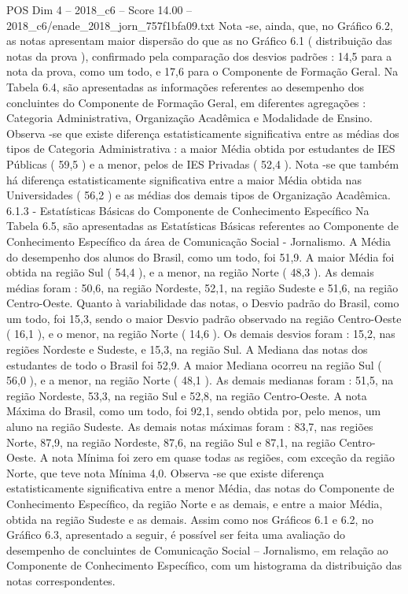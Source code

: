 \begin{textsample}{POS Dim 4 – 2018\_c6 – Score 14.00 – 2018\_c6/enade\_2018\_jorn\_757f1bfa09.txt}
Nota -se, ainda, que, no Gráfico 6.2, as notas apresentam maior dispersão do que as no Gráfico 6.1 ( distribuição das notas da prova ), confirmado pela comparação dos desvios padrões : 14,5 para a nota da prova, como um todo, e 17,6 para o Componente de Formação Geral.
Na Tabela 6.4, são apresentadas as informações referentes ao desempenho dos concluintes do Componente de Formação Geral, em diferentes agregações : Categoria Administrativa, Organização Acadêmica e Modalidade de Ensino.
Observa -se que existe diferença estatisticamente significativa entre as médias dos tipos de Categoria Administrativa : a maior Média obtida por estudantes de IES Públicas ( 59,5 ) e a menor, pelos de IES Privadas ( 52,4 ).
Nota -se que também há diferença estatisticamente significativa entre a maior Média obtida nas Universidades ( 56,2 ) e as médias dos demais tipos de Organização Acadêmica. 6.1.3 - Estatísticas Básicas do Componente de Conhecimento Específico Na Tabela 6.5, são apresentadas as Estatísticas Básicas referentes ao Componente de Conhecimento Específico da área de Comunicação Social - Jornalismo.
A Média do desempenho dos alunos do Brasil, como um todo, foi 51,9.
A maior Média foi obtida na região Sul ( 54,4 ), e a menor, na região Norte ( 48,3 ).
As demais médias foram : 50,6, na região Nordeste, 52,1, na região Sudeste e 51,6, na região Centro-Oeste.
Quanto à variabilidade das notas, o Desvio padrão do Brasil, como um todo, foi 15,3, sendo o maior Desvio padrão observado na região Centro-Oeste ( 16,1 ), e o menor, na região Norte ( 14,6 ).
Os demais desvios foram : 15,2, nas regiões Nordeste e Sudeste, e 15,3, na região Sul.
A Mediana das notas dos estudantes de todo o Brasil foi 52,9.
A maior Mediana ocorreu na região Sul ( 56,0 ), e a menor, na região Norte ( 48,1 ).
As demais medianas foram : 51,5, na região Nordeste, 53,3, na região Sul e 52,8, na região Centro-Oeste.
A nota Máxima do Brasil, como um todo, foi 92,1, sendo obtida por, pelo menos, um aluno na região Sudeste.
As demais notas máximas foram : 83,7, nas regiões Norte, 87,9, na região Nordeste, 87,6, na região Sul e 87,1, na região Centro-Oeste.
A nota Mínima foi zero em quase todas as regiões, com exceção da região Norte, que teve nota Mínima 4,0.
Observa -se que existe diferença estatisticamente significativa entre a menor Média, das notas do Componente de Conhecimento Específico, da região Norte e as demais, e entre a maior Média, obtida na região Sudeste e as demais.
Assim como nos Gráficos 6.1 e 6.2, no Gráfico 6.3, apresentado a seguir, é possível ser feita uma avaliação do desempenho de concluintes de Comunicação Social – Jornalismo, em relação ao Componente de Conhecimento Específico, com um histograma da distribuição das notas correspondentes.

\end{textsample}
